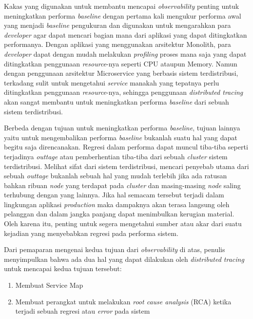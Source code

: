 Kakas yang digunakan untuk membantu mencapai \textit{observability} penting untuk meningkatkan performa \textit{baseline} dengan pertama kali mengukur performa awal yang menjadi \textit{baseline} pengukuran dan digunakan untuk mengarahkan para \textit{developer} agar dapat mencari bagian mana dari aplikasi yang dapat ditingkatkan performanya. Dengan aplikasi yang menggunakan arsitektur Monolith, para \textit{developer} dapat dengan mudah melakukan \textit{profiling} proses mana saja yang dapat ditingkatkan penggunaan \textit{resource}-nya seperti CPU ataupun Memory. Namun dengan penggunaan arsitektur Microservice yang berbasis sistem terdistribusi, terkadang sulit untuk mengetahui \textit{service} manakah yang tepatnya perlu ditingkatkan penggunaan \textit{resource}-nya, sehingga penggunaan \textit{distributed tracing} akan sangat membantu untuk meningkatkan performa \textit{baseline} dari sebuah sistem terdistribusi.

Berbeda dengan tujuan untuk meningkatkan performa \textit{baseline}, tujuan lainnya yaitu untuk mengembalikan performa \textit{baseline} bukanlah suatu hal yang dapat begitu saja direncanakan. Regresi dalam performa dapat muncul tiba-tiba seperti terjadinya \textit{outtage} atau pemberhentian tiba-tiba dari sebuah \textit{cluster} sistem terdistribusi. Melihat sifat dari sistem terdistribusi, mencari penyebab utama dari sebuah \textit{outtage} bukanlah sebuah hal yang mudah terlebih jika ada ratusan bahkan ribuan \textit{node} yang terdapat pada \textit{cluster} dan masing-masing \textit{node} saling terhubung dengan yang lainnya. Jika hal semacam tersebut terjadi dalam lingkungan aplikasi \textit{production} maka dampaknya akan terasa langsung oleh pelanggan dan dalam jangka panjang dapat menimbulkan kerugian material. Oleh karena itu, penting untuk segera mengetahui sumber atau akar dari suatu kejadian yang menyebabkan regresi pada performa sistem.

Dari pemaparan mengenai kedua tujuan dari \textit{observability} di atas, penulis menyimpulkan bahwa ada dua hal yang dapat dilakukan oleh \textit{distributed tracing} untuk mencapai kedua tujuan tersebut:
\begin{enumerate}
	\item Membuat Service Map
	\item Membuat perangkat untuk melakukan \textit{root cause analysis} (RCA) ketika terjadi sebuah regresi atau \textit{error} pada sistem
\end{enumerate}

